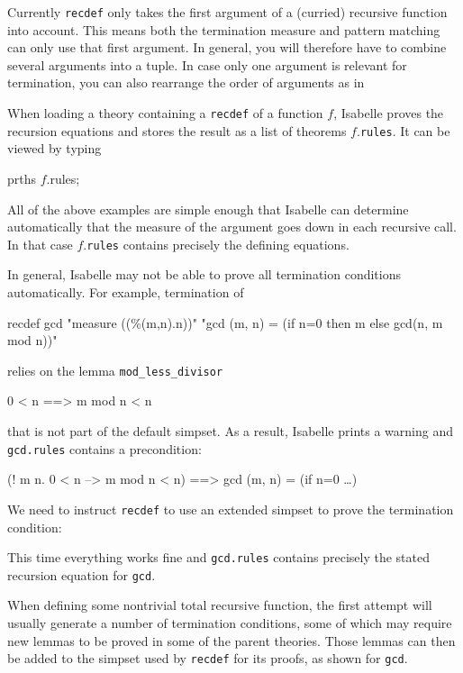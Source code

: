 \begin{warn}
  Currently \texttt{recdef} only takes the first argument of a (curried)
  recursive function into account. This means both the termination measure
  and pattern matching can only use that first argument. In general, you will
  therefore have to combine several arguments into a tuple. In case only one
  argument is relevant for termination, you can also rearrange the order of
  arguments as in
\begin{ttbox}
\end{ttbox}
\end{warn}

When loading a theory containing a \texttt{recdef} of a function $f$,
Isabelle proves the recursion equations and stores the result as a list of
theorems $f$.\texttt{rules}. It can be viewed by typing
\begin{ttbox}
prths \(f\).rules;
\end{ttbox}
All of the above examples are simple enough that Isabelle can determine
automatically that the measure of the argument goes down in each recursive
call. In that case $f$.\texttt{rules} contains precisely the defining
equations.

In general, Isabelle may not be able to prove all termination conditions
automatically. For example, termination of
\begin{ttbox}
recdef gcd "measure ((\%(m,n).n))"
  "gcd (m, n) = (if n=0 then m else gcd(n, m mod n))"
\end{ttbox}
relies on the lemma \texttt{mod_less_divisor}
\begin{ttbox}
0 < n ==> m mod n < n
\end{ttbox}
that is not part of the default simpset. As a result, Isabelle prints a
warning and \texttt{gcd.rules} contains a precondition:
\begin{ttbox}
(! m n. 0 < n --> m mod n < n) ==> gcd (m, n) = (if n=0 \dots)
\end{ttbox}
We need to instruct \texttt{recdef} to use an extended simpset to prove the
termination condition:
\begin{ttbox}
\end{ttbox}
This time everything works fine and \texttt{gcd.rules} contains precisely the
stated recursion equation for \texttt{gcd}.

When defining some nontrivial total recursive function, the first attempt
will usually generate a number of termination conditions, some of which may
require new lemmas to be proved in some of the parent theories. Those lemmas
can then be added to the simpset used by \texttt{recdef} for its
proofs, as shown for \texttt{gcd}.

